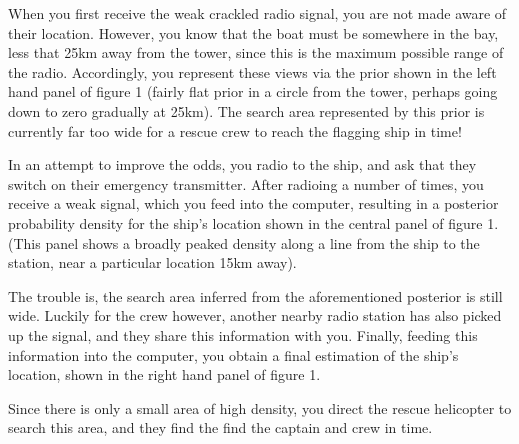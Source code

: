 \documentclass[11pt,fullpage]{book}
\begin{document}
When you first receive the weak crackled radio signal, you are not made aware of their location. However, you know that the boat must be somewhere in the bay, less that 25km away from the tower, since this is the maximum possible range of the radio. Accordingly, you represent these views via the prior shown in the left hand panel of figure 1 (fairly flat prior in a circle from the tower, perhaps going down to zero gradually at 25km). The search area represented by this prior is currently far too wide for a rescue crew to reach the flagging ship in time!

In an attempt to improve the odds, you radio to the ship, and ask that they switch on their emergency transmitter. After radioing a number of times, you receive a weak signal, which you feed into the computer, resulting in a posterior probability density for the ship's location shown in the central panel of figure 1. (This panel shows a broadly peaked density along a line from the ship to the station, near a particular location 15km away).

The trouble is, the search area inferred from the aforementioned posterior is still wide. Luckily for the crew however, another nearby radio station has also picked up the signal, and they share this information with you. Finally, feeding this information into the computer, you obtain a final estimation of the ship's location, shown in the right hand panel of figure 1. 

Since there is only a small area of high density, you direct the rescue helicopter to search this area, and they find the find the captain and crew in time.
\end{document}
